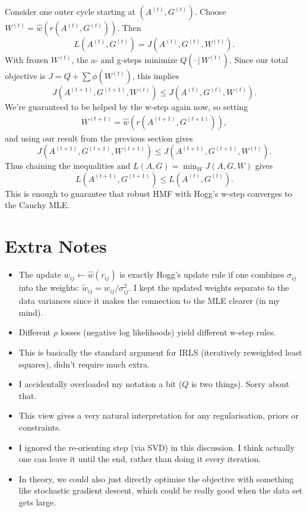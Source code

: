 \documentclass[11pt]{article}
\begin{document}
Consider one outer cycle starting at $(A^{(t)}, G^{(t)})$.  
Choose $W^{(t)} = \hat{w}(r(A^{(t)},G^{(t)}))$.  
Then
\begin{equation}
    L(A^{(t)}, G^{(t)}) = J(A^{(t)}, G^{(t)}, W^{(t)}).
\end{equation}
With frozen $W^{(t)}$, the a- and g-steps minimize $Q(\cdot \,| \,W^{(t)})$.
Since our total objective is $J = Q + \sum \phi(W^{(t)})$, this implies
\begin{equation}    
    J(A^{(t+1)}, G^{(t+1)}, W^{(t)}) \le J(A^{(t)}, G^{(t)}, W^{(t)}).
\end{equation}
We're guaranteed to be helped by the w-step again now, so setting
\begin{align}
    W^{(t+1)} = \hat{w} \left( r(A^{(t+1)}, G^{(t+1)}) \right),
\end{align}
and using our result from the previous section gives
\begin{equation}
    J(A^{(t+1)}, G^{(t+1)}, W^{(t+1)}) \le J(A^{(t+1)}, G^{(t+1)}, W^{(t)}).
\end{equation}
Thus chaining the inequalities and $L(A,G) = \min_W J(A, G, W)$ gives
\begin{equation}
    L(A^{(t+1)}, G^{(t+1)}) \le L(A^{(t)}, G^{(t)}).
\end{equation}
This is enough to guarantee that robust HMF with Hogg's w-step converges to the Cauchy MLE.

\section*{Extra Notes}

\begin{itemize}
    \item The update $w_{ij} \leftarrow \hat{w}(r_{ij})$ is exactly Hogg's update rule if one combines $\sigma_{ij}$ into the weights: 
    $\tilde{w}_{ij} = w_{ij}/\sigma_{ij}^2$. I kept the updated weights separate to the data variances since it makes the connection to the MLE clearer (in my mind).
    \item Different $\rho$ losses (negative log likelihoods) yield different w-step rules.
    \item This is basically the standard argument for IRLS (iteratively reweighted least squares), didn't require much extra.
    \item I accidentally overloaded my notation a bit ($Q$ is two things). Sorry about that.
    \item This view gives a very natural interpretation for any regularisation, priors or constraints.
    \item I ignored the re-orienting step (via SVD) in this discussion. I think actually one can leave it until the end, rather than doing it every iteration.
    \item In theory, we could also just directly optimise the objective with something like stochastic gradient descent, which could be really good when the data set gets large.
\end{itemize}
\end{document}
